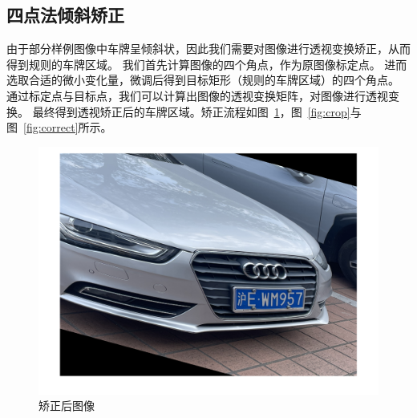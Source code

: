 \documentclass[utf8,a4paper]{ctexart}
\begin{document}
\subsection{四点法倾斜矫正}
由于部分样例图像中车牌呈倾斜状，因此我们需要对图像进行透视变换矫正，从而得到规则的车牌区域。
我们首先计算图像的四个角点，作为原图像标定点。
进而选取合适的微小变化量，微调后得到目标矩形（规则的车牌区域）的四个角点。
通过标定点与目标点，我们可以计算出图像的透视变换矩阵，对图像进行透视变换。
最终得到透视矫正后的车牌区域。矫正流程如图~\ref{fig:perspective}，图~\ref{fig:crop}与图~\ref{fig:correct}所示。

\begin{figure}[H]
    \center
    \includegraphics[width=.6\textwidth]{./img/difficult/矫正.png}
    \caption{矫正后图像}
    \label{fig:perspective}
\end{figure}
\end{document}
